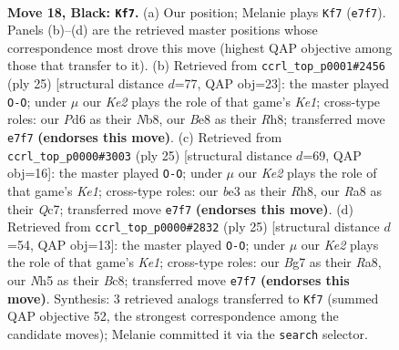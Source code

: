 \documentclass[11pt]{article}
\begin{document}
\clearpage

\begin{figure}[p]\centering
\begin{subfigure}{0.46\textwidth}\centering
\resizebox{\linewidth}{!}{%
\newchessgame
\chessboard[
  setfen={rn2b2r/ppq1k1bp/3pp1p1/4p1Pn/4P3/2N1B3/PPPK1PQP/3RRB2 b - - 5 18},
  showmover=false,
  pgfstyle=straightmove, color=movearrow, markmove={e7-f7}
]}
\caption{}
\end{subfigure}\hfill
\begin{subfigure}{0.46\textwidth}\centering
\resizebox{\linewidth}{!}{%
\newchessgame
\chessboard[
  setfen={rn2k2r/2q2ppp/pp1pbn2/4p3/4P3/1N1B4/PPPBQPPP/R4RK1 b kq - 1 13},
  showmover=false,
  pgfstyle=straightmove, color=movearrow, markmove={e8-g8}
]}
\caption{}
\end{subfigure}
\\[4pt]
\begin{subfigure}{0.46\textwidth}\centering
\resizebox{\linewidth}{!}{%
\newchessgame
\chessboard[
  setfen={r3k2r/1pqn1ppp/p1p1b3/P1b1p3/4P3/2NBB3/1PP1QPPP/R4RK1 b kq - 0 13},
  showmover=false,
  pgfstyle=straightmove, color=movearrow, markmove={e8-g8}
]}
\caption{}
\end{subfigure}\hfill
\begin{subfigure}{0.46\textwidth}\centering
\resizebox{\linewidth}{!}{%
\newchessgame
\chessboard[
  setfen={r1b1k2r/1pq1ppbp/p2p4/3Pn1p1/3B4/1N6/PPP1BPPP/R2Q1RK1 b kq - 3 13},
  showmover=false,
  pgfstyle=straightmove, color=movearrow, markmove={e8-g8}
]}
\caption{}
\end{subfigure}
\caption{\textbf{Move 18, Black: \texttt{Kf7}.} (a) Our position; Melanie plays \texttt{Kf7} (\texttt{e7f7}). Panels (b)--(d) are the retrieved master positions whose correspondence most drove this move (highest QAP objective among those that transfer to it). (b) Retrieved from \texttt{ccrl\_top\_p0001\#2456} (ply 25) [structural distance $d$=77, QAP obj=23]: the master played \texttt{O-O}; under $\mu$ our \emph{Ke2} plays the role of that game's \emph{Ke1}; cross-type roles: our \emph{P}d6 as their \emph{N}b8, our \emph{B}e8 as their \emph{R}h8; transferred move \texttt{e7f7} \textbf{(endorses this move)}. (c) Retrieved from \texttt{ccrl\_top\_p0000\#3003} (ply 25) [structural distance $d$=69, QAP obj=16]: the master played \texttt{O-O}; under $\mu$ our \emph{Ke2} plays the role of that game's \emph{Ke1}; cross-type roles: our \emph{b}e3 as their \emph{R}h8, our \emph{R}a8 as their \emph{Q}c7; transferred move \texttt{e7f7} \textbf{(endorses this move)}. (d) Retrieved from \texttt{ccrl\_top\_p0000\#2832} (ply 25) [structural distance $d$=54, QAP obj=13]: the master played \texttt{O-O}; under $\mu$ our \emph{Ke2} plays the role of that game's \emph{Ke1}; cross-type roles: our \emph{B}g7 as their \emph{R}a8, our \emph{N}h5 as their \emph{B}c8; transferred move \texttt{e7f7} \textbf{(endorses this move)}. Synthesis: 3 retrieved analogs transferred to \texttt{Kf7} (summed QAP objective 52, the strongest correspondence among the candidate moves); Melanie committed it via the \texttt{search} selector.}
\label{fig:thought-m35}
\end{figure}
\end{document}
